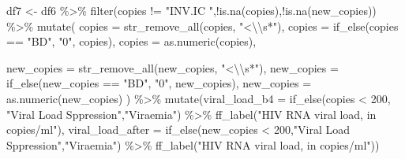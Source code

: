 \documentclass[
  letterpaper,
  DIV=11,
  numbers=noendperiod]{scrartcl}
\newenvironment{Shaded}{\begin{snugshade}}{\end{snugshade}}
\newcommand{\AttributeTok}[1]{\textcolor[rgb]{0.40,0.45,0.13}{#1}}
\newcommand{\DecValTok}[1]{\textcolor[rgb]{0.68,0.00,0.00}{#1}}
\newcommand{\FunctionTok}[1]{\textcolor[rgb]{0.28,0.35,0.67}{#1}}
\newcommand{\NormalTok}[1]{\textcolor[rgb]{0.00,0.23,0.31}{#1}}
\newcommand{\OtherTok}[1]{\textcolor[rgb]{0.00,0.23,0.31}{#1}}
\newcommand{\SpecialCharTok}[1]{\textcolor[rgb]{0.37,0.37,0.37}{#1}}
\newcommand{\StringTok}[1]{\textcolor[rgb]{0.13,0.47,0.30}{#1}}
\begin{document}
\begin{Shaded}
\begin{Highlighting}[]
\NormalTok{df7 }\OtherTok{\textless{}{-}}\NormalTok{ df6 }\SpecialCharTok{\%\textgreater{}\%} \FunctionTok{filter}\NormalTok{(copies }\SpecialCharTok{!=} \StringTok{"INV.IC "}\NormalTok{,}\SpecialCharTok{!}\FunctionTok{is.na}\NormalTok{(copies),}\SpecialCharTok{!}\FunctionTok{is.na}\NormalTok{(new\_copies)) }\SpecialCharTok{\%\textgreater{}\%} 
  \FunctionTok{mutate}\NormalTok{(}
    \AttributeTok{copies =} \FunctionTok{str\_remove\_all}\NormalTok{(copies, }\StringTok{"\textless{}}\SpecialCharTok{\textbackslash{}\textbackslash{}}\StringTok{s*"}\NormalTok{),}
    \AttributeTok{copies =} \FunctionTok{if\_else}\NormalTok{(copies }\SpecialCharTok{==} \StringTok{"BD"}\NormalTok{, }\StringTok{"0"}\NormalTok{, copies),}
    \AttributeTok{copies =} \FunctionTok{as.numeric}\NormalTok{(copies),}
    
    \AttributeTok{new\_copies =} \FunctionTok{str\_remove\_all}\NormalTok{(new\_copies, }\StringTok{"\textless{}}\SpecialCharTok{\textbackslash{}\textbackslash{}}\StringTok{s*"}\NormalTok{),}
    \AttributeTok{new\_copies =} \FunctionTok{if\_else}\NormalTok{(new\_copies }\SpecialCharTok{==} \StringTok{"BD"}\NormalTok{, }\StringTok{"0"}\NormalTok{, new\_copies),}
    \AttributeTok{new\_copies =} \FunctionTok{as.numeric}\NormalTok{(new\_copies)}
\NormalTok{  ) }\SpecialCharTok{\%\textgreater{}\%} 
  \FunctionTok{mutate}\NormalTok{(}\AttributeTok{viral\_load\_b4 =} \FunctionTok{if\_else}\NormalTok{(copies }\SpecialCharTok{\textless{}} \DecValTok{200}\NormalTok{, }\StringTok{"Viral Load Sppression"}\NormalTok{,}\StringTok{"Viraemia"}\NormalTok{) }\SpecialCharTok{\%\textgreater{}\%} 
           \FunctionTok{ff\_label}\NormalTok{(}\StringTok{"HIV RNA viral load, in copies/ml"}\NormalTok{),}
         \AttributeTok{viral\_load\_after =} \FunctionTok{if\_else}\NormalTok{(new\_copies }\SpecialCharTok{\textless{}} \DecValTok{200}\NormalTok{,}\StringTok{"Viral Load Sppression"}\NormalTok{,}\StringTok{"Viraemia"}\NormalTok{) }\SpecialCharTok{\%\textgreater{}\%} 
           \FunctionTok{ff\_label}\NormalTok{(}\StringTok{"HIV RNA viral load, in copies/ml"}\NormalTok{))}
\end{Highlighting}
\end{Shaded}
\end{document}
